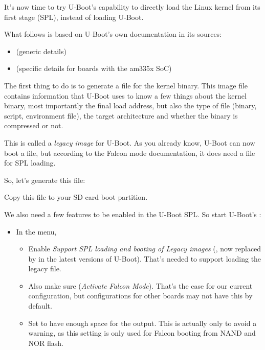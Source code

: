 It's now time to try U-Boot's capability to directly load the
Linux kernel from its first stage (SPL), instead of loading U-Boot.

What follows is based on U-Boot's own documentation in its sources:
\begin{itemize}
\item {} (generic details)
\item {} (specific details for boards with
      the am335x SoC)
\end{itemize}

The first thing to do is to generate a  file for the kernel
binary. This image file contains information that U-Boot uses to know a
few things about the kernel binary, most importantly the final load
address, but also the type of file (binary, script, environment file),
the target architecture and whether the binary is compressed or not.

This is called a {\em legacy image} for U-Boot. As you already know,
U-Boot can now boot a  file, but according to the Falcon
mode documentation, it does need a  file for SPL loading.

So, let's generate this file:

Copy this  file to your SD card boot partition.

We also need a few features to be enabled in the U-Boot SPL. So start
U-Boot's :
\begin{itemize}
\item In the  menu,
      \begin{itemize}
      \item Enable {\em Support SPL loading and booting of Legacy images}
	    (, now replaced by
	     in the latest
	    versions of U-Boot).
            That's needed to support loading the legacy  file.
      \item Also make sure 
            ({\em Activate Falcon Mode}).
            That's the case for our current configuration, but configurations
            for other boards may not have this by default.
      \item Set  to have
	    enough space for the  output. This is actually
	    only to avoid a warning, as this setting is only used for
	    Falcon booting from NAND and NOR flash.
      \end{itemize}
\end{itemize}

